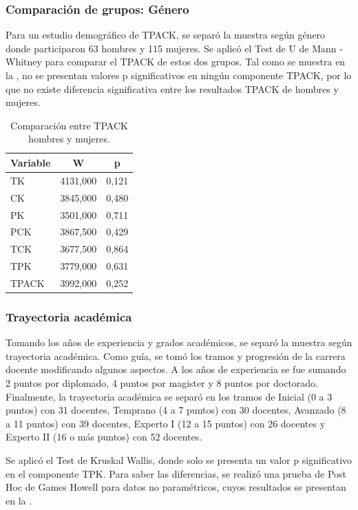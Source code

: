 \documentclass[spanish]{textolivre}
\begin{document}
\subsubsection{Comparación de grupos: Género }\label{sec-format-simple}
Para un estudio demográfico de TPACK, se separó la muestra según género donde participaron 63 hombres y 115 mujeres. Se aplicó el Test de U de Mann - Whitney para comparar el TPACK de estos dos grupos. Tal como se muestra en la , no se presentan valores p significativos en ningún componente TPACK, por lo que no existe diferencia significativa entre los resultados TPACK de hombres y mujeres.

\begin{table}[h!]
\centering
\begin{threeparttable}
\caption{Comparación entre TPACK hombres y mujeres.}
\label{tab03}
\centering
\begin{tabular}{lSS}
\toprule
Variable & W & p \\
\midrule
TK & 4131,000 & 0,121 \\
CK & 3845,000 & 0,480 \\
PK & 3501,000 & 0,711 \\
PCK & 3867,500 & 0,429 \\
TCK & 3677,500 & 0,864 \\
TPK & 3779,000 & 0,631 \\ 
TPACK & 3992,000 & 0,252 \\ 
\bottomrule
\end{tabular}
\end{threeparttable}
\end{table}

\subsubsection{Trayectoria académica}\label{sec-links}
Tomando los años de experiencia y grados académicos, se separó la muestra según trayectoria académica. Como guía, se tomó los tramos y progresión de la carrera docente modificando algunos aspectos. A los años de experiencia se fue sumando 2 puntos por diplomado, 4 puntos por magister y 8 puntos por doctorado. Finalmente, la trayectoria académica se separó en los tramos de Inicial (0 a 3 puntos) con 31 docentes, Temprano (4 a 7 puntos) con 30 docentes, Avanzado (8 a 11 puntos) con 39 docentes, Experto I (12 a 15 puntos) con 26 docentes y Experto II (16 o más puntos) con 52 docentes.

Se aplicó el Test de Kruskal Wallis, donde solo se presenta un valor p significativo en el componente TPK. Para saber las diferencias, se realizó una prueba de Post Hoc de Games Howell para datos no paramétricos, cuyos resultados se presentan en la .
\end{document}
